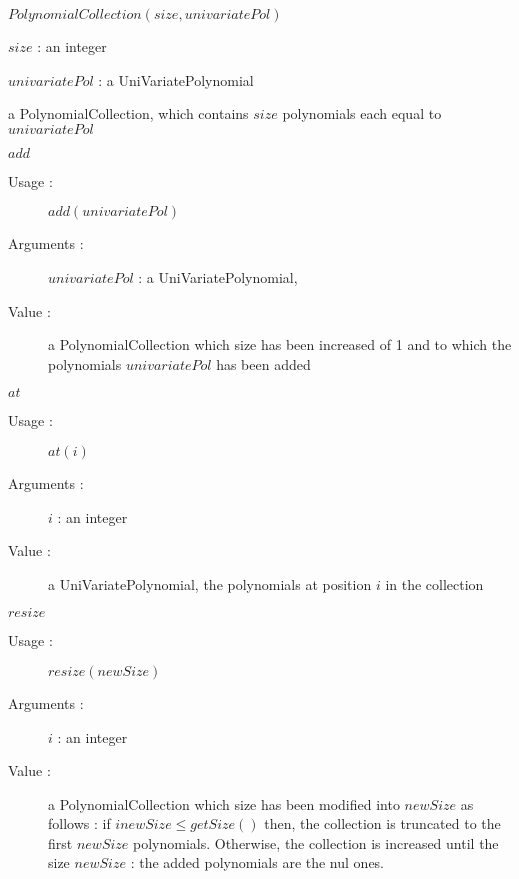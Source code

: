 \begin{description}

\item[Usage :] $PolynomialCollection(size, univariatePol)$

\item[Arguments :]  \rule{0pt}{1em}
  \begin{description}
  \item $size$ : an integer
  \item $univariatePol$ : a UniVariatePolynomial
  \end{description}

\item[Value :] a PolynomialCollection, which contains $size$ polynomials each equal to  $univariatePol$

\item[Some methods :]  \rule{0pt}{1em}

\item $add$
  \begin{description}
  \item[Usage :]  $add(univariatePol)$
  \item[Arguments :] $univariatePol$ : a UniVariatePolynomial,
  \item[Value :] a PolynomialCollection which size has been increased of 1 and to which the polynomials $univariatePol$ has been added
  \end{description}
  \bigskip

\item $at$
  \begin{description}
  \item[Usage :]  $at(i)$
  \item[Arguments :] $i$ : an integer
  \item[Value :] a UniVariatePolynomial, the polynomials at position $i$ in the collection
  \end{description}
  \bigskip

\item $resize$
  \begin{description}
  \item[Usage :]  $resize(newSize)$
  \item[Arguments :] $i$ : an integer
  \item[Value :] a PolynomialCollection which size has been modified into $newSize$ as follows : if $inewSize \leq getSize()$ then, the collection is truncated to the first $newSize$ polynomials. Otherwise, the collection is increased until the size $newSize$ : the added polynomials are the nul ones.
  \end{description}


\end{description}



